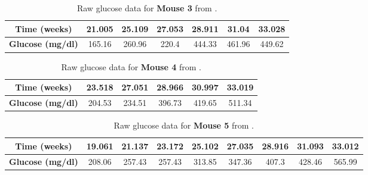 \begin{appendices}
\begin{table}[H]
\centering
  \begin{center} 
    \begin{tabular} {c|c|c|c|c|c|c}%
    \cline{1-7}
      \textbf{Time (weeks)} & 21.005 & 25.109 & 27.053 & 28.911 & 31.04 & 33.028\\
      \hline
      \textbf{Glucose (mg/dl)} & 165.16 & 260.96 & 220.4 & 444.33 & 461.96 & 449.62\\
      \hline
    \end{tabular}
    \caption{Raw glucose data for \textbf{Mouse 3} from \cite{Lietal2009}.}
    \label{table:Li_Mouse3}
  \end{center}
\end{table}

\begin{table}[H]
\centering
  \begin{center} 
    \begin{tabular} {c|c|c|c|c|c}%
    \cline{1-6}
      \textbf{Time (weeks)} & 23.518 & 27.051 & 28.966 & 30.997 & 33.019\\
      \hline
      \textbf{Glucose (mg/dl)} & 204.53 & 234.51 & 396.73 & 419.65 & 511.34\\
      \hline
    \end{tabular}
    \caption{Raw glucose data for \textbf{Mouse 4} from \cite{Lietal2009}.}
    \label{table:Li_Mouse4}
  \end{center}
\end{table}

\begin{table}[H]
\centering
  \begin{center} 
    \begin{tabular} {c|c|c|c|c|c|c|c|c}%
    \cline{1-9}
      \textbf{Time (weeks)} & 19.061 & 21.137 & 23.172 & 25.102 & 27.035 & 28.916 & 31.093 & 33.012\\
      \hline
      \textbf{Glucose (mg/dl)} & 208.06 & 257.43 & 257.43 & 313.85 & 347.36 & 407.3 & 428.46 & 565.99\\
      \hline
    \end{tabular}
    \caption{Raw glucose data for \textbf{Mouse 5} from \cite{Lietal2009}.}
    \label{table:Li_Mouse5}
  \end{center}
\end{table}


\end{appendices}
